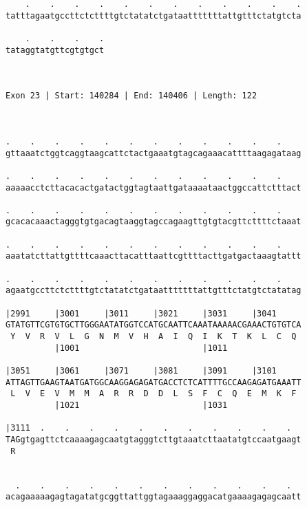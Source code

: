 \documentclass{article}
\begin{document}
\begin{Verbatim}
    .    .    .    .    .    .    .    .    .    .    .    .
tatttagaatgccttctcttttgtctatatctgataatttttttattgtttctatgtcta
                                                            
    .    .    .    .
tataggtatgttcgtgtgct
                    
                    
 
Exon 23 | Start: 140284 | End: 140406 | Length: 122



.    .    .    .    .    .    .    .    .    .    .    .    
gttaaatctggtcaggtaagcattctactgaaatgtagcagaaacattttaagagataag
                                                            
.    .    .    .    .    .    .    .    .    .    .    .    
aaaaacctcttacacactgatactggtagtaattgataaaataactggccattctttact
                                                            
.    .    .    .    .    .    .    .    .    .    .    .    
gcacacaaactagggtgtgacagtaaggtagccagaagttgtgtacgttcttttctaaat
                                                            
.    .    .    .    .    .    .    .    .    .    .    .    
aaatatcttattgttttcaaacttacatttaattcgttttacttgatgactaaagtattt
                                                            
.    .    .    .    .    .    .    .    .    .    .    .    
agaatgccttctcttttgtctatatctgataatttttttattgtttctatgtctatatag
                                                            
|2991     |3001     |3011     |3021     |3031     |3041     
GTATGTTCGTGTGCTTGGGAATATGGTCCATGCAATTCAAATAAAAACGAAACTGTGTCA
 Y  V  R  V  L  G  N  M  V  H  A  I  Q  I  K  T  K  L  C  Q 
          |1001                         |1011               
  
|3051     |3061     |3071     |3081     |3091     |3101     
ATTAGTTGAAGTAATGATGGCAAGGAGAGATGACCTCTCATTTTGCCAAGAGATGAAATT
 L  V  E  V  M  M  A  R  R  D  D  L  S  F  C  Q  E  M  K  F 
          |1021                         |1031               
  
|3111  .    .    .    .    .    .    .    .    .    .    .  
TAGgtgagttctcaaaagagcaatgtagggtcttgtaaatcttaatatgtccaatgaagt
 R                                                          
                                                            
  
  .    .    .    .    .    .    .    .    .    .    .    .  
acagaaaaagagtagatatgcggttattggtagaaaggaggacatgaaaagagagcaatt
                                                            

\end{Verbatim}
\end{document}
